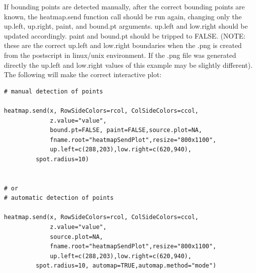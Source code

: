 \documentclass[]{article}
\begin{document}
\indent If bounding points are detected manually, after the correct bounding points are known, the heatmap.send function call should be run again, changing only the up.left, up.right, paint, and bound.pt arguments. up.left and low.right should be updated accordingly. paint and bound.pt should be tripped to FALSE. (NOTE: these are the correct up.left and low.right boundaries when the .png is created from the postscript in linux/unix environment. If the .png file was generated directly the up.left and low.right values of this example may be slightly different).  The following will make the correct interactive plot:
\begin{verbatim}
# manual detection of points

heatmap.send(x, RowSideColors=rcol, ColSideColors=ccol,
             z.value="value",
             bound.pt=FALSE, paint=FALSE,source.plot=NA,
             fname.root="heatmapSendPlot",resize="800x1100",
             up.left=c(288,203),low.right=c(620,940),
	     spot.radius=10)


# or 
# automatic detection of points

heatmap.send(x, RowSideColors=rcol, ColSideColors=ccol,
             z.value="value",
             source.plot=NA,
             fname.root="heatmapSendPlot",resize="800x1100",
             up.left=c(288,203),low.right=c(620,940),
	     spot.radius=10, automap=TRUE,automap.method="mode")

\end{verbatim}
\end{document}

